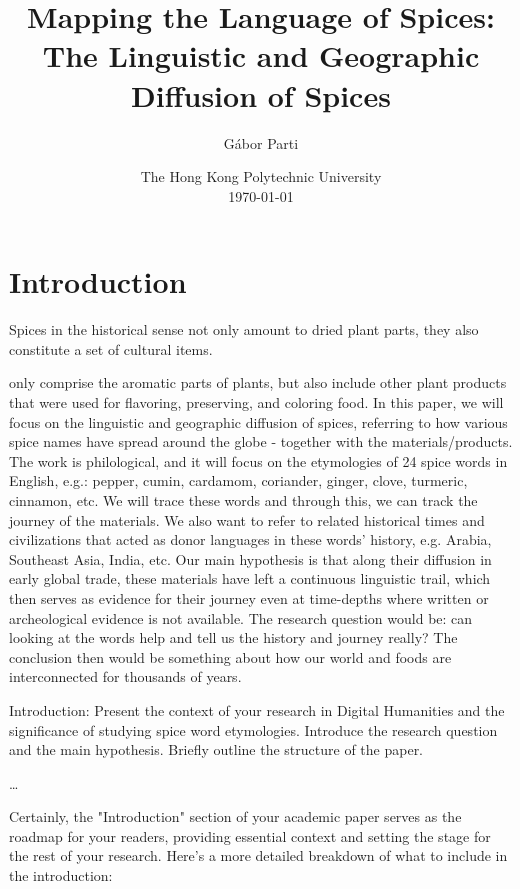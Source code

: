 \documentclass[12pt]{article}
\title{Mapping the Language of Spices: The Linguistic and Geographic Diffusion of Spices}
\author{Gábor Parti {\small\orcid{0000-0003-2042-4655}}}
\date{The Hong Kong Polytechnic University\\[2.5ex]\today}
\begin{document}
\maketitle

\begin{abstract}
\end{abstract}


\section{Introduction}

Spices in the historical sense not only amount to dried plant parts, they also constitute a set of cultural items. 

only comprise the aromatic parts of plants, but also include other plant products that were used for flavoring, preserving, and coloring food. In this paper, we will focus on the linguistic and geographic diffusion of spices, referring to how various spice names have spread around the globe - together with the materials/products. The work is philological, and it will focus on the etymologies of 24 spice words in English, e.g.: pepper, cumin, cardamom, coriander, ginger, clove, turmeric, cinnamon, etc. We will trace these words and through this, we can track the journey of the materials. We also want to refer to related historical times and civilizations that acted as donor languages in these words' history, e.g. Arabia, Southeast Asia, India, etc. Our main hypothesis is that along their diffusion in early global trade, these materials have left a continuous linguistic trail, which then serves as evidence for their journey even at time-depths where written or archeological evidence is not available. The research question would be: can looking at the words help and tell us the history and journey really? The conclusion then would be something about how our world and foods are interconnected for thousands of years.







Introduction:
Present the context of your research in Digital Humanities and the significance of studying spice word etymologies.
Introduce the research question and the main hypothesis.
Briefly outline the structure of the paper.

\dots

Certainly, the "Introduction" section of your academic paper serves as the roadmap for your readers, providing essential context and setting the stage for the rest of your research. Here's a more detailed breakdown of what to include in the introduction:
\end{document}
